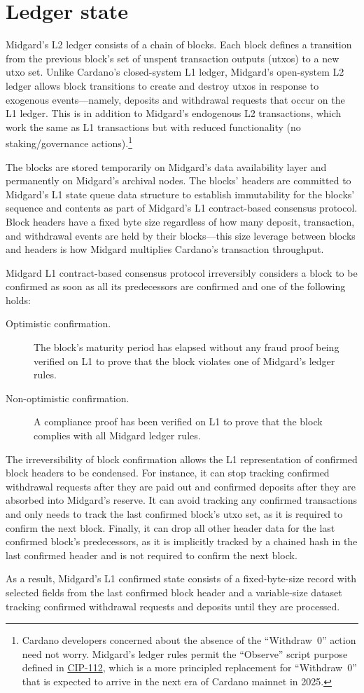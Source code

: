 \documentclass[../midgard.tex]{subfiles}
\begin{document}
\chapter{Ledger state}
\label{h:ledger-state}

Midgard's L2 ledger consists of a chain of blocks.
Each block defines a transition from the previous block's set of unspent transaction outputs (utxos) to a new utxo set.
Unlike Cardano's closed-system L1 ledger, Midgard's open-system L2 ledger allows block transitions to create and destroy utxos in response to exogenous events---namely, deposits and withdrawal requests that occur on the L1 ledger.
This is in addition to Midgard's endogenous L2 transactions, which work the same as L1 transactions but with reduced functionality (no staking/governance actions).\footnote{Cardano developers concerned about the absence of the ``Withdraw~0'' action need not worry.
Midgard's ledger rules permit the ``Observe'' script purpose defined in \href{https://github.com/cardano-foundation/CIPs/tree/master/CIP-0112}{CIP-112}, which is a more principled replacement for ``Withdraw~0'' that is expected to arrive in the next era of Cardano mainnet in 2025.}

The blocks are stored temporarily on Midgard's data availability layer and permanently on Midgard's archival nodes.
The blocks' headers are committed to Midgard's L1 state queue data structure to establish immutability for the blocks' sequence and contents as part of Midgard's L1 contract-based consensus protocol.
Block headers have a fixed byte size regardless of how many deposit, transaction, and withdrawal events are held by their blocks---this size leverage between blocks and headers is how Midgard multiplies Cardano's transaction throughput.

Midgard L1 contract-based consensus protocol irreversibly considers a block to be confirmed as soon as all its predecessors are confirmed and one of the following holds:
\begin{description}
    \item[Optimistic confirmation.] The block's maturity period has elapsed without any fraud proof being verified on L1 to prove that the block violates one of Midgard's ledger rules.
    \item[Non-optimistic confirmation.] A compliance proof has been verified on L1 to prove that the block complies with all Midgard ledger rules.
\end{description}

The irreversibility of block confirmation allows the L1 representation of confirmed block headers to be condensed.
For instance, it can stop tracking confirmed withdrawal requests after they are paid out and confirmed deposits after they are absorbed into Midgard's reserve.
It can avoid tracking any confirmed transactions and only needs to track the last confirmed block's utxo set, as it is required to confirm the next block.
Finally, it can drop all other header data for the last confirmed block's predecessors, as it is implicitly tracked by a chained hash in the last confirmed header and is not required to confirm the next block.

As a result, Midgard's L1 confirmed state consists of a fixed-byte-size record with selected fields from the last confirmed block header and a variable-size dataset tracking confirmed withdrawal requests and deposits until they are processed.
\end{document}
